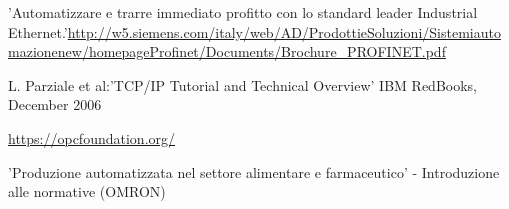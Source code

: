 \documentclass[12pt, a4paper, oneside]{book}
\begin{document}
\newpage
\begin{thebibliography}{100}
	'Automatizzare e trarre immediato profitto con lo standard leader Industrial Ethernet.'\url{http://w5.siemens.com/italy/web/AD/ProdottieSoluzioni/Sistemiautomazionenew/homepageProfinet/Documents/Brochure_PROFINET.pdf}	
	
	L. Parziale et al:'TCP/IP Tutorial and Technical Overview' IBM RedBooks, December 2006
	
	\url{https://opcfoundation.org/}
	
	'Produzione automatizzata nel settore alimentare e farmaceutico' - Introduzione alle normative (OMRON)
	
	

	
\end{thebibliography}
\end{document}
